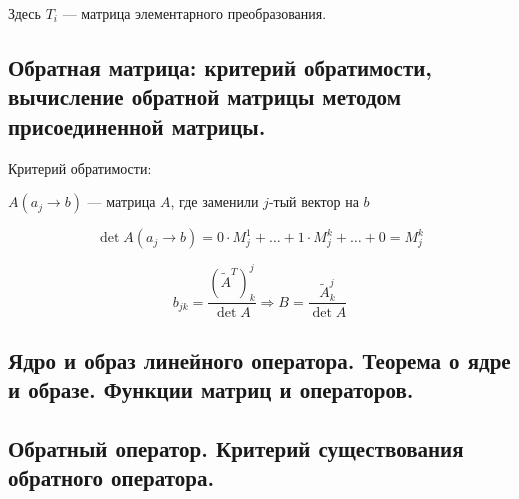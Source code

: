 
Здесь $T_i$ --- матрица элементарного преобразования.

\subsection{Обратная матрица: критерий обратимости, вычисление обратной матрицы методом присоединенной матрицы.}

Критерий обратимости: 


$A(a_j \to b)$ --- матрица $A$, где заменили $j$-тый вектор на $b$

$$\det A(a_j\to b) = 0 \cdot M_j^1 + \ldots + 1 \cdot M_j^k + \ldots + 0 = M^k_j$$

$$b_{jk} = \frac{(\tilde A^T)^j_k}{\det A} \Rightarrow B = \frac{\tilde A_k^j}{\det A}$$

\subsection{Ядро и образ линейного оператора. Теорема о ядре и образе. Функции матриц и операторов.}


\subsection{Обратный оператор. Критерий существования обратного оператора.}



